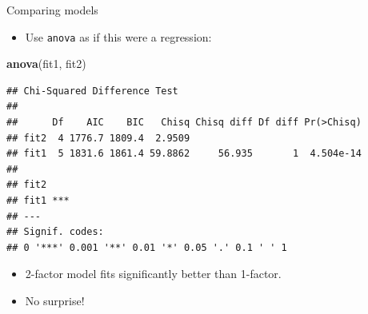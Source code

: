 \documentclass[ignorenonframetext,]{beamer}
\newenvironment{Shaded}{\begin{snugshade}}{\end{snugshade}}
\newcommand{\KeywordTok}[1]{\textcolor[rgb]{0.13,0.29,0.53}{\textbf{#1}}}
\newcommand{\NormalTok}[1]{#1}
\providecommand{\tightlist}{%
  \setlength{\itemsep}{0pt}\setlength{\parskip}{0pt}}
\begin{document}
\begin{frame}[fragile]{Comparing models}
\protect\hypertarget{comparing-models}{}

\begin{itemize}
\tightlist
\item
  Use \texttt{anova} as if this were a regression:
\end{itemize}

\scriptsize

\begin{Shaded}
\begin{Highlighting}[]
\KeywordTok{anova}\NormalTok{(fit1, fit2)}
\end{Highlighting}
\end{Shaded}

\begin{verbatim}
## Chi-Squared Difference Test
## 
##      Df    AIC    BIC   Chisq Chisq diff Df diff Pr(>Chisq)
## fit2  4 1776.7 1809.4  2.9509                              
## fit1  5 1831.6 1861.4 59.8862     56.935       1  4.504e-14
##         
## fit2    
## fit1 ***
## ---
## Signif. codes:  
## 0 '***' 0.001 '**' 0.01 '*' 0.05 '.' 0.1 ' ' 1
\end{verbatim}

\normalsize

\begin{itemize}
\item
  2-factor model fits significantly better than 1-factor.
\item
  No surprise!
\end{itemize}

\end{frame}
\end{document}
